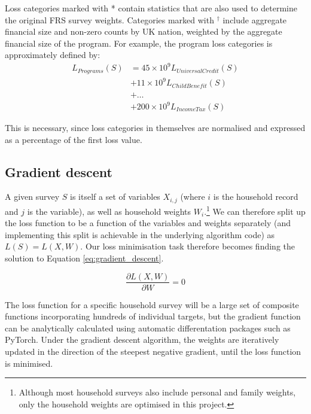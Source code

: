 \documentclass[10pt,journal,compsoc]{IEEEtran}
\begin{document}
Loss categories marked with * contain statistics that are also used to determine the original FRS survey weights. Categories marked with $^\dagger$ include aggregate financial size and non-zero counts by UK nation, weighted by the aggregate financial size of the program. For example, the program loss categories is approximately defined by:
\begin{equation}
  \begin{split}
  L_{Programs}(S) &= 45 \times 10 ^ 9 L_{Universal Credit} (S)\\& + 11 \times 10 ^ 9 L_{Child Benefit} (S)\\& + \dots\\& + 200 \times 10 ^ 9 L_{Income Tax} (S)
  \end{split}
\end{equation}

This is necessary, since loss categories in themselves are normalised and expressed as a percentage of the first loss value.

\subsection{Gradient descent}

A given survey $S$ is itself a set of variables $X_{i,j}$ (where $i$ is the household record and $j$ is the variable), as well as household weights $W_i$.\footnote{Although most household surveys also include personal and family weights, only the household weights are optimised in this project.} We can therefore split up the loss function to be a function of the variables and weights separately (and implementing this split is achievable in the underlying algorithm code) as $L(S) = L(X, W)$. Our loss minimisation task therefore becomes finding the solution to Equation \ref{eq:gradient_descent}.

\begin{equation}
  \frac{\partial L(X, W)}{\partial W} = 0
  \label{eq:gradient_descent}
\end{equation}

The loss function for a specific household survey will be a large set of composite functions incorporating hundreds of individual targets, but the gradient function can be analytically calculated using automatic differentation packages such as PyTorch\cite{pytorch}. Under the gradient descent algorithm\cite{anns}, the weights are iteratively updated in the direction of the steepest negative gradient, until the loss function is minimised.
\end{document}
